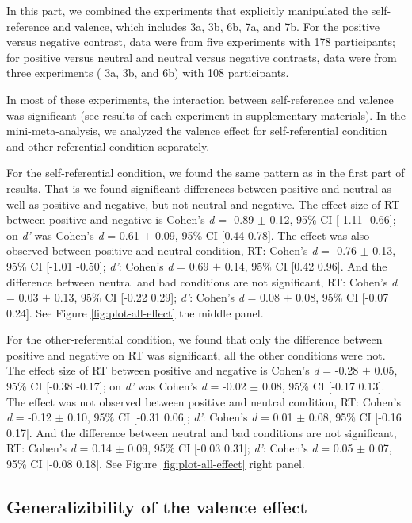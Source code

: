 \documentclass[
  english,
  man]{apa6}
\begin{document}
In this part, we combined the experiments that explicitly manipulated the self-reference and valence, which includes 3a, 3b, 6b, 7a, and 7b. For the positive versus negative contrast, data were from five experiments with 178 participants; for positive versus neutral and neutral versus negative contrasts, data were from three experiments ( 3a, 3b, and 6b) with 108 participants.

In most of these experiments, the interaction between self-reference and valence was significant (see results of each experiment in supplementary materials). In the mini-meta-analysis, we analyzed the valence effect for self-referential condition and other-referential condition separately.

For the self-referential condition, we found the same pattern as in the first part of results. That is we found significant differences between positive and neutral as well as positive and negative, but not neutral and negative. The effect size of RT between positive and negative is Cohen's \emph{d} = -0.89 \(\pm\) 0.12, 95\% CI {[}-1.11 -0.66{]}; on \emph{d'} was Cohen's \emph{d} = 0.61 \(\pm\) 0.09, 95\% CI {[}0.44 0.78{]}. The effect was also observed between positive and neutral condition, RT: Cohen's \emph{d} = -0.76 \(\pm\) 0.13, 95\% CI {[}-1.01 -0.50{]}; \emph{d'}: Cohen's \emph{d} = 0.69 \(\pm\) 0.14, 95\% CI {[}0.42 0.96{]}. And the difference between neutral and bad conditions are not significant, RT: Cohen's \emph{d} = 0.03 \(\pm\) 0.13, 95\% CI {[}-0.22 0.29{]}; \emph{d'}: Cohen's \emph{d} = 0.08 \(\pm\) 0.08, 95\% CI {[}-0.07 0.24{]}. See Figure \ref{fig:plot-all-effect} the middle panel.

For the other-referential condition, we found that only the difference between positive and negative on RT was significant, all the other conditions were not. The effect size of RT between positive and negative is Cohen's \emph{d} = -0.28 \(\pm\) 0.05, 95\% CI {[}-0.38 -0.17{]}; on \emph{d'} was Cohen's \emph{d} = -0.02 \(\pm\) 0.08, 95\% CI {[}-0.17 0.13{]}. The effect was not observed between positive and neutral condition, RT: Cohen's \emph{d} = -0.12 \(\pm\) 0.10, 95\% CI {[}-0.31 0.06{]}; \emph{d'}: Cohen's \emph{d} = 0.01 \(\pm\) 0.08, 95\% CI {[}-0.16 0.17{]}. And the difference between neutral and bad conditions are not significant, RT: Cohen's \emph{d} = 0.14 \(\pm\) 0.09, 95\% CI {[}-0.03 0.31{]}; \emph{d'}: Cohen's \emph{d} = 0.05 \(\pm\) 0.07, 95\% CI {[}-0.08 0.18{]}. See Figure \ref{fig:plot-all-effect} right panel.

\hypertarget{generalizibility-of-the-valence-effect}{%
\subsection{Generalizibility of the valence effect}\label{generalizibility-of-the-valence-effect}}
\end{document}
